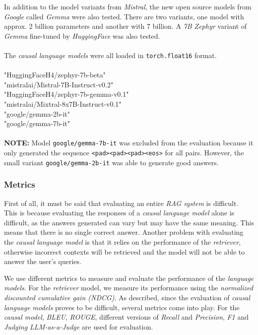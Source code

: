 \documentclass{article}
\begin{document}
In addition to the model variants from \textit{Mistral}, the new open source models from \textit{Google} called \textit{Gemma} were also tested. There are two variants, one model with approx. 2 billion parameters and another with 7 billion. A \textit{7B Zephyr} variant of \textit{Gemma} fine-tuned by \textit{HuggingFace} was also tested.\\
\\
The \textit{causal language models} were all loaded in \colorbox{lightgray!25}{\lstinline{torch.float16}} format.\\
\\
"HuggingFaceH4/zephyr-7b-beta"\\
"mistralai/Mistral-7B-Instruct-v0.2"\\
"HuggingFaceH4/zephyr-7b-gemma-v0.1"\\
"mistralai/Mixtral-8x7B-Instruct-v0.1"\\
"google/gemma-2b-it"\\
"google/gemma-7b-it"\\
\\
\textbf{NOTE:} Model \colorbox{lightgray!25}{\lstinline{google/gemma-7b-it}} was excluded from the evaluation because it only generated the sequence \colorbox{lightgray!25}{\lstinline{<pad><pad><pad><eos>}} for all pairs. However, the small variant \colorbox{lightgray!25}{\lstinline{google/gemma-2b-it}} was able to generate good answers.

\subsubsection{Metrics}\label{metrics}
First of all, it must be said that evaluating an entire \textit{RAG system} is difficult. This is because evaluating the responses of a \textit{causal language model} alone is difficult, as the answers generated can vary but may have the same meaning. This means that there is no single correct answer. Another problem with evaluating the \textit{causal language model }is that it relies on the performance of the \textit{retriever}, otherwise incorrect contexts will be retrieved and the model will not be able to answer the user's queries. 

We use different metrics to measure and evaluate the performance of the \textit{language models}. For the \textit{retriever} model, we measure its performance using the \textit{normalized discounted cumulative gain (NDCG)}. As described, since the evaluation of \textit{causal language models} proves to be difficult, several metrics come into play. For the \textit{causal model}, \textit{BLEU}, \textit{ROUGE}, different versions of \textit{Recall} and \textit{Precision}, \textit{F1} and \textit{Judging LLM-as-a-Judge} are used for evaluation.
\end{document}
